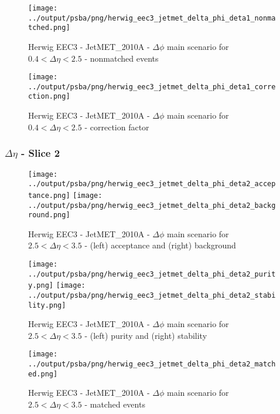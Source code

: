 \documentclass[11pt]{book}
\begin{document}
\begin{figure}[ht]
\centering
\texttt{[image: ../output/psba/png/herwig\_eec3\_jetmet\_delta\_phi\_deta1\_nonmatched.png]}
\caption{Herwig EEC3 - JetMET\_2010A - $\Delta\phi$ main scenario for $0.4 < \Delta\eta < 2.5$ - nonmatched events}
\label{fig:hw_eec3_jetmet_delta_phi_deta1_nonmatched}
\end{figure}

\begin{figure}[ht]
\centering
\texttt{[image: ../output/psba/png/herwig\_eec3\_jetmet\_delta\_phi\_deta1\_correction.png]}
\caption{Herwig EEC3 - JetMET\_2010A - $\Delta\phi$ main scenario for $0.4 < \Delta\eta < 2.5$ - correction factor}
\label{fig:hw_eec3_jetmet_delta_phi_deta1_correction}
\end{figure}


\clearpage
\subsubsection{$\Delta\eta$ - Slice 2}

\begin{figure}[ht]
\centering
\texttt{[image: ../output/psba/png/herwig\_eec3\_jetmet\_delta\_phi\_deta2\_acceptance.png]}
\texttt{[image: ../output/psba/png/herwig\_eec3\_jetmet\_delta\_phi\_deta2\_background.png]}
\caption{Herwig EEC3 - JetMET\_2010A - $\Delta\phi$ main scenario for $2.5 < \Delta\eta < 3.5$ - (left) acceptance and (right) background}
\label{fig:hw_eec3_jetmet_delta_phi_deta2_ab}
\end{figure}

\begin{figure}[ht]
\centering
\texttt{[image: ../output/psba/png/herwig\_eec3\_jetmet\_delta\_phi\_deta2\_purity.png]}
\texttt{[image: ../output/psba/png/herwig\_eec3\_jetmet\_delta\_phi\_deta2\_stability.png]}
\caption{Herwig EEC3 - JetMET\_2010A - $\Delta\phi$ main scenario for $2.5 < \Delta\eta < 3.5$ - (left) purity and (right) stability}
\label{fig:hw_eec3_jetmet_delta_phi_deta2_ps}
\end{figure}

\begin{figure}[ht]
\centering
\texttt{[image: ../output/psba/png/herwig\_eec3\_jetmet\_delta\_phi\_deta2\_matched.png]}
\caption{Herwig EEC3 - JetMET\_2010A - $\Delta\phi$ main scenario for $2.5 < \Delta\eta < 3.5$ - matched events}
\label{fig:hw_eec3_jetmet_delta_phi_deta2_matched}
\end{figure}
\end{document}
